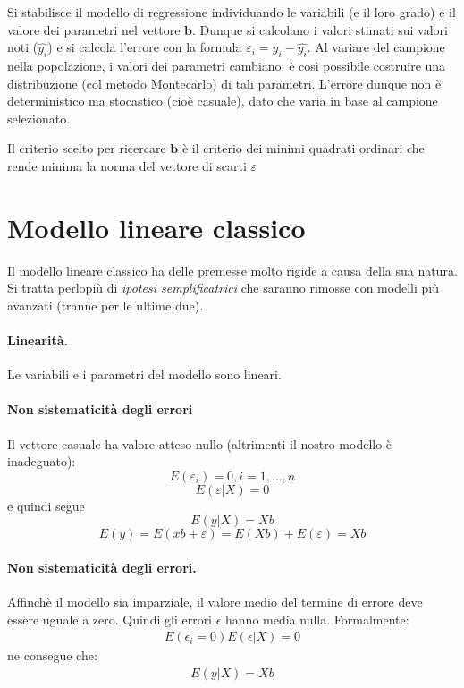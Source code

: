 \documentclass[11pt, twocolumn]{article}
\begin{document}
Si stabilisce il modello di regressione individuando le variabili (e il loro grado) e il valore dei parametri nel vettore $\textbf{b}$.
Dunque si calcolano i valori stimati sui valori noti ($\hat{y_i}$) e si calcola l'errore con la formula $\varepsilon_i = y_i - \hat{y_i}$.
Al variare del campione nella popolazione, i valori dei parametri cambiano: è così possibile costruire una distribuzione (col metodo Montecarlo) di tali parametri.
L'errore dunque non è deterministico ma stocastico (cioè casuale), dato che varia in base al campione selezionato.

Il criterio scelto per ricercare $\textbf{b}$ è il criterio dei minimi quadrati ordinari che rende minima la norma del vettore di scarti $\varepsilon$

\newpage
\part{Modello lineare classico}
Il modello lineare classico ha delle premesse molto rigide a causa della sua natura.
Si tratta perlopiù di \textit{ipotesi semplificatrici} che saranno rimosse con modelli più avanzati (tranne per le ultime due).

\subsection*{Linearità.}
Le variabili e i parametri del modello sono lineari.

\subsection*{Non sistematicità degli errori}
Il vettore casuale ha valore atteso nullo (altrimenti il nostro modello è inadeguato):
\begin{equation*}
  E(\varepsilon_i)=0, i=1,\hdots,n 
\end{equation*}
$$E(\varepsilon|X)=0$$
e quindi segue
\begin{equation*}
  E(y | X) = Xb
\end{equation*}
\begin{equation*}
E(y) = E(xb+\varepsilon) = E(Xb)+E(\varepsilon) = Xb
\end{equation*}

\subsection*{Non sistematicità degli errori.}
Affinchè il modello sia imparziale, il valore medio del termine di errore deve essere uguale a zero. Quindi gli errori $\epsilon$ hanno media nulla.
\newline
Formalmente:
\begin{align*}
E(\epsilon_i = 0)
E(\epsilon | X) = 0
\end{align*}
ne consegue che:
\begin{align*}
E(y | X) = Xb
\end{align*}
\end{document}
